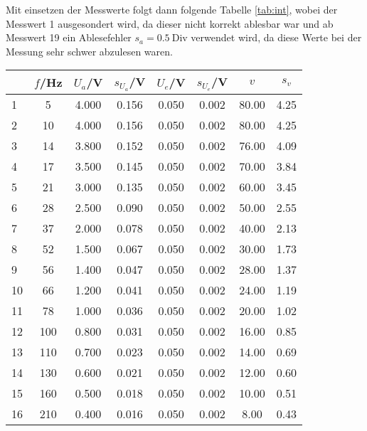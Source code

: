Mit einsetzen der Messwerte folgt dann folgende Tabelle \ref{tab:int}, wobei der Messwert 1 ausgesondert wird, da dieser nicht korrekt ablesbar war und ab Messwert 19 ein Ablesefehler $s_a = 0.5~\text{Div}$ verwendet wird, da diese Werte bei der Messung sehr schwer abzulesen waren.
\newpage
\begin{center}
    \begin{tabular}{l | c c c c c | c c}
        {} &   $f$/Hz &  $U_a$/V &  $s_{U_a}$/V &  $U_e$/V &  $s_{U_e}$/V 
        &      $v$ &   $s_v$ \\
        \hline
        1  &      5 &  4.000 &      0.156 &   0.050 &      0.002 &  80.00 &  4.25 \\
        2  &     10 &  4.000 &      0.156 &   0.050 &      0.002 &  80.00 &  4.25 \\
        3  &     14 &  3.800 &      0.152 &   0.050 &      0.002 &  76.00 &  4.09 \\
        4  &     17 &  3.500 &      0.145 &   0.050 &      0.002 &  70.00 &  3.84 \\
        5  &     21 &  3.000 &      0.135 &   0.050 &      0.002 &  60.00 &  3.45 \\
        6  &     28 &  2.500 &      0.090 &   0.050 &      0.002 &  50.00 &  2.55 \\
        7  &     37 &  2.000 &      0.078 &   0.050 &      0.002 &  40.00 &  2.13 \\
        8  &     52 &  1.500 &      0.067 &   0.050 &      0.002 &  30.00 &  1.73 \\
        9  &     56 &  1.400 &      0.047 &   0.050 &      0.002 &  28.00 &  1.37 \\
        10 &     66 &  1.200 &      0.041 &   0.050 &      0.002 &  24.00 &  1.19 \\
        11 &     78 &  1.000 &      0.036 &   0.050 &      0.002 &  20.00 &  1.02 \\
        12 &    100 &  0.800 &      0.031 &   0.050 &      0.002 &  16.00 &  0.85 \\
        13 &    110 &  0.700 &      0.023 &   0.050 &      0.002 &  14.00 &  0.69 \\
        14 &    130 &  0.600 &      0.021 &   0.050 &      0.002 &  12.00 &  0.60 \\
        15 &    160 &  0.500 &      0.018 &   0.050 &      0.002 &  10.00 &  0.51 \\
        16 &    210 &  0.400 &      0.016 &   0.050 &      0.002 &   8.00 &  0.43 \\

\end{tabular}
\end{center}
